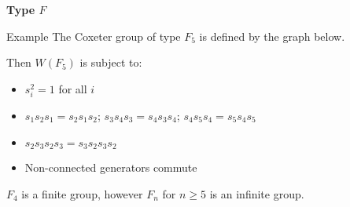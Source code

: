 \documentclass[9pt,handout]{beamer}
\newcommand{\<}{\langle}
\renewcommand{\>}{\rangle}
\DeclareMathOperator{\Sym}{Sym}
\begin{document}




\begin{frame}{\textbf{Type $F$}}

\begin{block}{Example}
The Coxeter group of type $F_5$ is defined by the graph below.
\begin{figure}
\end{figure}
\vspace{-1em}
\pause Then $W(F_{5})$ is subject to:
\begin{itemize}
\item $s_{i}^{2}=1$ for all $i$
\item $s_{1}s_{2}s_{1}=s_{2}s_{1}s_{2}$; \quad $s_{3}s_{4}s_{3}=s_{4}s_{3}s_{4}$; \quad$s_{4}s_{5}s_{4}=s_{5}s_{4}s_{5}$ 
\item $s_{2}s_{3}s_{2}s_{3}=s_{3}s_{2}s_{3}s_{2}$
\item Non-connected generators commute
\end{itemize}

\medskip

\pause $F_{4}$ is a finite group, however $F_{n}$ for $n \geq  5$ is an infinite group.
\end{block}

\end{frame}

\end{document}
